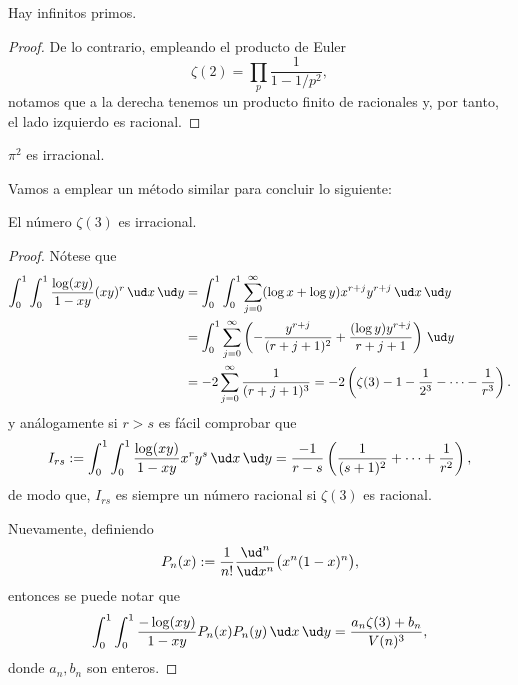 \documentclass[teoria-numeros.tex]{subfiles}
\begin{document}
\begin{cor}
	Hay infinitos primos.
\end{cor}
\begin{proof}
	De lo contrario, empleando el producto de Euler
	$$ \zeta(2) = \prod_{p} \frac{1}{1 - 1/p^2}, $$
	notamos que a la derecha tenemos un producto finito de racionales y, por tanto, el lado izquierdo es racional.
\end{proof}
\begin{cor}
	$\pi^2$ es irracional.
\end{cor}

Vamos a emplear un método similar para concluir lo siguiente:
\begin{thm}[Apéry]
	El número $\zeta(3)$ es irracional.
\end{thm}
\begin{proof}
	Nótese que
	\begin{align*}
		\int_{0}^{1} \int_{0}^{1} \frac{\log(xy)}{1 - xy}(xy)^r \, \ud x \, \ud y &= \int_{0}^{1} \int_{0}^{1} \sum_{j=0}^{\infty} (\log x + \log y)x^{r+j} y^{r+j} \, \ud x \, \ud y \\
											  &= \int_{0}^{1} \sum_{j=0}^{\infty} \left( -\frac{y^{r+j}}{(r+j+1)^2} +
											  \frac{(\log y) y^{r+j}}{r+j+1} \right)\, \ud y \\
											  &= -2 \sum_{j=0}^{\infty} \frac{1}{(r+j+1)^3}
											  = -2\left( \zeta(3) - 1 - \frac{1}{2^3} - \cdots - \frac{1}{r^3} \right).
	\end{align*}
	y análogamente si $r > s$ es fácil comprobar que
	$$ I_{rs} := \int_{0}^{1} \int_{0}^{1} \frac{\log(xy)}{1 - xy}x^r y^s \, \ud x \, \ud y =
	\frac{-1}{r - s}\left( \frac{1}{(s+1)^2} + \cdots + \frac{1}{r^2} \right), $$
	de modo que, $I_{rs}$ es siempre un número racional si $\zeta(3)$ es racional.

	Nuevamente, definiendo
	$$ P_n(x) := \frac{1}{n!} \frac{\ud^n}{\ud x^n}\big( x^n(1 - x)^n \big), $$
	entonces se puede notar que
	$$ \int_{0}^{1} \int_{0}^{1} \frac{-\log(xy)}{1 - xy} P_n(x) P_n(y) \, \ud x \, \ud y = \frac{a_n \zeta(3) + b_n}{V(n)^3}, $$
	donde $a_n, b_n$ son enteros.


\end{proof}
\end{document}
